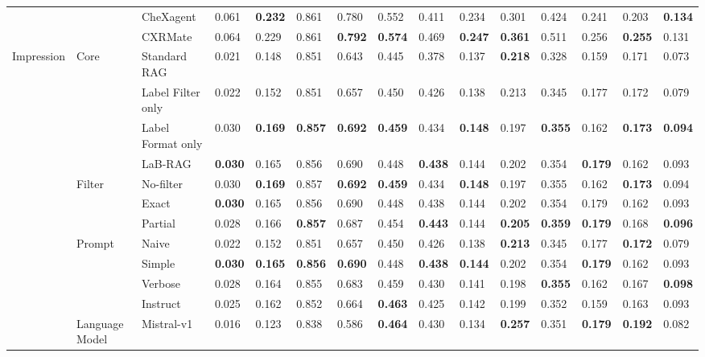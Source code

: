 \begin{tabular}{lllllllllllllll}
 &  & CheXagent & 0.061 & \textbf{0.232} & 0.861 & 0.780 & 0.552 & 0.411 & 0.234 & 0.301 & 0.424 & 0.241 & 0.203 & \textbf{0.134} \\
 &  & CXRMate & 0.064 & 0.229 & 0.861 & \textbf{0.792} & \textbf{0.574} & 0.469 & \textbf{0.247} & \textbf{0.361} & 0.511 & 0.256 & \textbf{0.255} & 0.131 \\
\cmidrule{1-15} \cmidrule{2-15}
\multirow[c]{29}{*}{Impression} & \multirow[c]{4}{*}{Core} & Standard RAG & 0.021 & 0.148 & 0.851 & 0.643 & 0.445 & 0.378 & 0.137 & \textbf{0.218} & 0.328 & 0.159 & 0.171 & 0.073 \\
 &  & Label Filter only & 0.022 & 0.152 & 0.851 & 0.657 & 0.450 & 0.426 & 0.138 & 0.213 & 0.345 & 0.177 & 0.172 & 0.079 \\
 &  & Label Format only & 0.030 & \textbf{0.169} & \textbf{0.857} & \textbf{0.692} & \textbf{0.459} & 0.434 & \textbf{0.148} & 0.197 & \textbf{0.355} & 0.162 & \textbf{0.173} & \textbf{0.094} \\
 &  & LaB-RAG & \textbf{0.030} & 0.165 & 0.856 & 0.690 & 0.448 & \textbf{0.438} & 0.144 & 0.202 & 0.354 & \textbf{0.179} & 0.162 & 0.093 \\
\cmidrule{2-15}
 & \multirow[c]{3}{*}{Filter} & No-filter & 0.030 & \textbf{0.169} & 0.857 & \textbf{0.692} & \textbf{0.459} & 0.434 & \textbf{0.148} & 0.197 & 0.355 & 0.162 & \textbf{0.173} & 0.094 \\
 &  & Exact & \textbf{0.030} & 0.165 & 0.856 & 0.690 & 0.448 & 0.438 & 0.144 & 0.202 & 0.354 & 0.179 & 0.162 & 0.093 \\
 &  & Partial & 0.028 & 0.166 & \textbf{0.857} & 0.687 & 0.454 & \textbf{0.443} & 0.144 & \textbf{0.205} & \textbf{0.359} & \textbf{0.179} & 0.168 & \textbf{0.096} \\
\cmidrule{2-15}
 & \multirow[c]{4}{*}{Prompt} & Naive & 0.022 & 0.152 & 0.851 & 0.657 & 0.450 & 0.426 & 0.138 & \textbf{0.213} & 0.345 & 0.177 & \textbf{0.172} & 0.079 \\
 &  & Simple & \textbf{0.030} & \textbf{0.165} & \textbf{0.856} & \textbf{0.690} & 0.448 & \textbf{0.438} & \textbf{0.144} & 0.202 & 0.354 & \textbf{0.179} & 0.162 & 0.093 \\
 &  & Verbose & 0.028 & 0.164 & 0.855 & 0.683 & 0.459 & 0.430 & 0.141 & 0.198 & \textbf{0.355} & 0.162 & 0.167 & \textbf{0.098} \\
 &  & Instruct & 0.025 & 0.162 & 0.852 & 0.664 & \textbf{0.463} & 0.425 & 0.142 & 0.199 & 0.352 & 0.159 & 0.163 & 0.093 \\
\cmidrule{2-15}
 & \multirow[c]{3}{*}{Language Model} & Mistral-v1 & 0.016 & 0.123 & 0.838 & 0.586 & \textbf{0.464} & 0.430 & 0.134 & \textbf{0.257} & 0.351 & \textbf{0.179} & \textbf{0.192} & 0.082 \\

\end{tabular}
